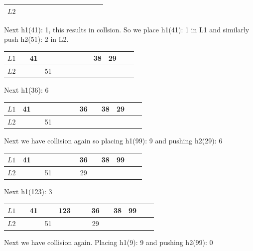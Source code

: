 \documentclass[addpoints]{exam}
\begin{document}
\begin{solution}
\begin{center}
\begin{tabular}{|l||*{12}{c|}}
        $L2$  &  &  &  &  &  &  &  &   &   &   \\\hline
      \end{tabular}
    \end{center}
    Next h1(41): 1, this results in collsion. So we place h1(41): 1 in L1 and similarly push h2(51): 2 in L2.\\
    \begin{center}
      \begin{tabular}{|l||*{12}{c|}}
        \hline
        $L1$  &  & 41 &  &  &  &  &  &   & 38  & 29  \\\hline
        $L2$  &  &  & 51 &  &  &  &  &   &   &   \\\hline
      \end{tabular}
    \end{center}
    Next h1(36): 6\\
     \begin{center}
      \begin{tabular}{|l||*{12}{c|}}
        \hline
        $L1$  & 41 &  &  &  &  &  & 36 &   & 38  & 29  \\\hline
        $L2$  &  &  & 51 &  &  &  &  &   &   &   \\\hline
      \end{tabular}
    \end{center}
    Next we have collision again so placing h1(99): 9 and pushing h2(29): 6\\
     \begin{center}
      \begin{tabular}{|l||*{12}{c|}}
        \hline
        $L1$  & 41 &  &  &  &  &  & 36 &   & 38  & 99  \\\hline
        $L2$  &  &  & 51 &  &  &  & 29 &   &   &   \\\hline
      \end{tabular}
    \end{center}
    Next h1(123): 3\\
    \begin{center}
      \begin{tabular}{|l||*{12}{c|}}
        \hline
        $L1$  &  & 41 &  & 123 &  &  & 36 &   & 38  & 99  \\\hline
        $L2$  &  &  & 51 &  &  &  & 29 &   &   &   \\\hline
      \end{tabular}
    \end{center}
    Next we have collision again. Placing h1(9): 9 and pushing h2(99): 0\\

\end{solution}
\end{document}
